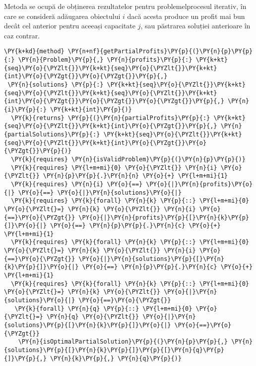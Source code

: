 \begin{sloppypar}
    Metoda  se ocupă de obținerea rezultatelor pentru problemelprocesul iterativ, în care se consideră adăugarea obiectului $i$ dacă acesta produce un profit mai bun decât cel anterior pentru aceeași capacitate $j$, sau păstrarea soluției anterioare în caz contrar.
    \begin{Verbatim}[commandchars=\\\{\}]
\PY{k+kd}{method} \PY{n+nf}{getPartialProfits}\PY{p}{(}\PY{n}{p}\PY{p}{:} \PY{n}{Problem}\PY{p}{,} \PY{n}{profits}\PY{p}{:} \PY{k+kt}{seq}\PY{o}{\PYZlt{}}\PY{k+kt}{seq}\PY{o}{\PYZlt{}}\PY{k+kt}{int}\PY{o}{\PYZgt{}}\PY{o}{\PYZgt{}}\PY{p}{,} 
 \PY{n}{solutions} \PY{p}{:} \PY{k+kt}{seq}\PY{o}{\PYZlt{}}\PY{k+kt}{seq}\PY{o}{\PYZlt{}}\PY{k+kt}{seq}\PY{o}{\PYZlt{}}\PY{k+kt}{int}\PY{o}{\PYZgt{}}\PY{o}{\PYZgt{}}\PY{o}{\PYZgt{}}\PY{p}{,} \PY{n}{i}\PY{p}{:} \PY{k+kt}{int}\PY{p}{)} 
  \PY{k}{returns} \PY{p}{(}\PY{n}{partialProfits}\PY{p}{:} \PY{k+kt}{seq}\PY{o}{\PYZlt{}}\PY{k+kt}{int}\PY{o}{\PYZgt{}}\PY{p}{,} \PY{n}{partialSolutions}\PY{p}{:} \PY{k+kt}{seq}\PY{o}{\PYZlt{}}\PY{k+kt}{seq}\PY{o}{\PYZlt{}}\PY{k+kt}{int}\PY{o}{\PYZgt{}}\PY{o}{\PYZgt{}}\PY{p}{)}
  \PY{k}{requires} \PY{n}{isValidProblem}\PY{p}{(}\PY{n}{p}\PY{p}{)}
  \PY{k}{requires} \PY{l+m+mi}{0} \PY{o}{\PYZlt{}} \PY{n}{i} \PY{o}{\PYZlt{}} \PY{n}{p}\PY{p}{.}\PY{n}{n} \PY{o}{+} \PY{l+m+mi}{1}
  \PY{k}{requires} \PY{n}{i} \PY{o}{==} \PY{o}{|}\PY{n}{profits}\PY{o}{|} \PY{o}{==} \PY{o}{|}\PY{n}{solutions}\PY{o}{|}
  \PY{k}{requires} \PY{k}{forall} \PY{n}{k} \PY{p}{::} \PY{l+m+mi}{0} \PY{o}{\PYZlt{}=} \PY{n}{k} \PY{o}{\PYZlt{}} \PY{n}{i} \PY{o}{==}\PY{o}{\PYZgt{}} \PY{o}{|}\PY{n}{profits}\PY{p}{[}\PY{n}{k}\PY{p}{]}\PY{o}{|} \PY{o}{==} \PY{n}{p}\PY{p}{.}\PY{n}{c} \PY{o}{+} \PY{l+m+mi}{1}
  \PY{k}{requires} \PY{k}{forall} \PY{n}{k} \PY{p}{::} \PY{l+m+mi}{0} \PY{o}{\PYZlt{}=} \PY{n}{k} \PY{o}{\PYZlt{}} \PY{n}{i} \PY{o}{==}\PY{o}{\PYZgt{}} \PY{o}{|}\PY{n}{solutions}\PY{p}{[}\PY{n}{k}\PY{p}{]}\PY{o}{|} \PY{o}{==} \PY{n}{p}\PY{p}{.}\PY{n}{c} \PY{o}{+} \PY{l+m+mi}{1}
  \PY{k}{requires} \PY{k}{forall} \PY{n}{k} \PY{p}{::} \PY{l+m+mi}{0} \PY{o}{\PYZlt{}=} \PY{n}{k} \PY{o}{\PYZlt{}} \PY{o}{|}\PY{n}{solutions}\PY{o}{|} \PY{o}{==}\PY{o}{\PYZgt{}} 
   \PY{k}{forall} \PY{n}{q} \PY{p}{::} \PY{l+m+mi}{0} \PY{o}{\PYZlt{}=} \PY{n}{q} \PY{o}{\PYZlt{}} \PY{o}{|}\PY{n}{solutions}\PY{p}{[}\PY{n}{k}\PY{p}{]}\PY{o}{|} \PY{o}{==}\PY{o}{\PYZgt{}} 
    \PY{n}{isOptimalPartialSolution}\PY{p}{(}\PY{n}{p}\PY{p}{,} \PY{n}{solutions}\PY{p}{[}\PY{n}{k}\PY{p}{]}\PY{p}{[}\PY{n}{q}\PY{p}{]}\PY{p}{,} \PY{n}{k}\PY{p}{,} \PY{n}{q}\PY{p}{)} 

\end{Verbatim}
\end{sloppypar}
